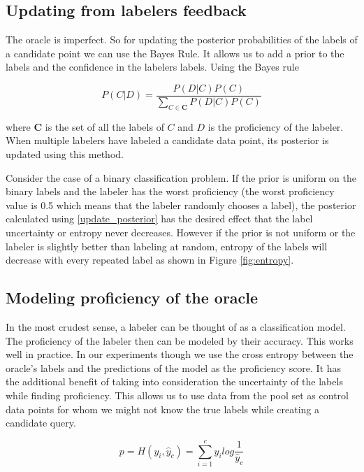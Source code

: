 \documentclass[twoside,11pt]{article}
\begin{document}
\subsection{Updating from labelers feedback}

The oracle is imperfect. So for updating the posterior probabilities of the labels of a candidate point we can use the Bayes Rule. It allows us to add a prior to the labels and the confidence in the labelers labels. Using the Bayes rule

\begin{equation}
    P(C|D) = \frac{P(D|C)P(C)}{ \sum_{C \in \boldsymbol{C}} P(D|C)P(C)}
    \label{update_posterior}
\end{equation}

where $\boldsymbol{C}$ is the set of all the labels of $C$ and $D$ is the proficiency of the labeler. When multiple labelers have labeled a candidate data point, its posterior is updated using this method.

Consider the case of a binary classification problem. If the prior is uniform on the binary labels and the labeler has the worst proficiency (the worst proficiency value is 0.5 which means that the labeler randomly chooses a label), the posterior calculated using \eqref{update_posterior} has the desired effect that the label uncertainty or entropy never decreases. However if the prior is not uniform or the labeler is slightly better than labeling at random, entropy of the labels will decrease with every repeated label as shown in Figure \ref{fig:entropy}.

\subsection{Modeling proficiency of the oracle}

In the most crudest sense, a labeler can be thought of as a classification model. The proficiency of the labeler then can be modeled by their accuracy. This works well in practice. In our experiments though we use the cross entropy between the oracle's labels and the predictions of the model as the proficiency score. It has the additional benefit of taking into consideration the uncertainty of the labels while finding proficiency. This allows us to use data from the pool set as control data points for whom we might not know the true labels while creating a candidate query.

\begin{equation}
    p = H(y_i, \hat{y}_c) = \sum^c_{i=1} y_i log \frac{1}{\hat{y}_c}
\end{equation}
\end{document}
